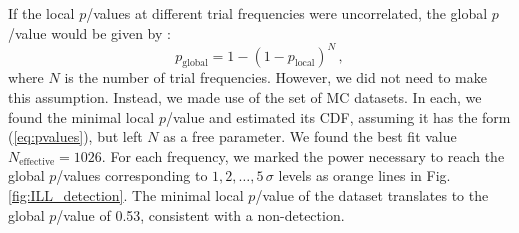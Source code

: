 If the local $p$\-/values at different trial frequencies were uncorrelated, the global $p$\-/value would be given by \cite{Algeri2016}:
\begin{equation}
	\label{eq:pvalues}
    p_\mathrm{global} = 1 - (1 - p_\mathrm{local})^N \, ,
\end{equation}
where $N$ is the number of trial frequencies.
However, we did not need to make this assumption.
Instead, we made use of the set of MC datasets.
In each, we found the minimal local $p$\-/value and estimated its CDF, assuming it has the form (\ref{eq:pvalues}), but left $N$ as a free parameter.
We found the best fit value $N_\mathrm{effective} = 1026$. %
For each frequency, we marked the power necessary to reach the global $p$\-/values corresponding to $1,2,…,5\,\sigma$
levels as orange lines in Fig.\,\ref{fig:ILL_detection}. The minimal local $p$\-/value of the dataset translates to the global $p$\-/value of 0.53, consistent with a non-detection.

